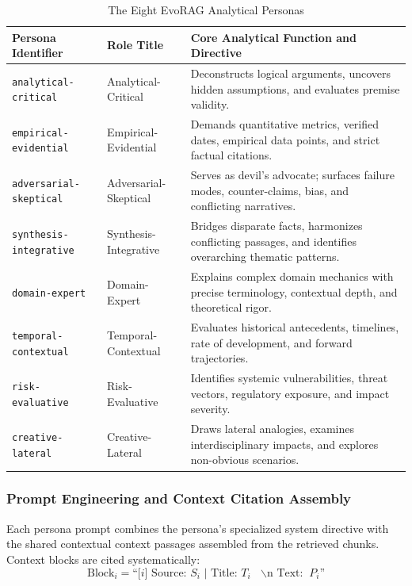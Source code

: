 \begin{table}[H]
\centering
\caption{The Eight EvoRAG Analytical Personas}
\label{tab:personas}
\small
\renewcommand{\arraystretch}{1.3}
\begin{tabularx}{\linewidth}{|l|p{3.8cm}|X|}
\hline
\textbf{Persona Identifier} & \textbf{Role Title} & \textbf{Core Analytical Function and Directive} \\
\hline
\texttt{analytical-critical} & Analytical-Critical & Deconstructs logical arguments, uncovers hidden assumptions, and evaluates premise validity. \\
\hline
\texttt{empirical-evidential} & Empirical-Evidential & Demands quantitative metrics, verified dates, empirical data points, and strict factual citations. \\
\hline
\texttt{adversarial-skeptical} & Adversarial-Skeptical & Serves as devil's advocate; surfaces failure modes, counter-claims, bias, and conflicting narratives. \\
\hline
\texttt{synthesis-integrative} & Synthesis-Integrative & Bridges disparate facts, harmonizes conflicting passages, and identifies overarching thematic patterns. \\
\hline
\texttt{domain-expert} & Domain-Expert & Explains complex domain mechanics with precise terminology, contextual depth, and theoretical rigor. \\
\hline
\texttt{temporal-contextual} & Temporal-Contextual & Evaluates historical antecedents, timelines, rate of development, and forward trajectories. \\
\hline
\texttt{risk-evaluative} & Risk-Evaluative & Identifies systemic vulnerabilities, threat vectors, regulatory exposure, and impact severity. \\
\hline
\texttt{creative-lateral} & Creative-Lateral & Draws lateral analogies, examines interdisciplinary impacts, and explores non-obvious scenarios. \\
\hline
\end{tabularx}
\end{table}

\subsubsection{Prompt Engineering and Context Citation Assembly}
Each persona prompt combines the persona's specialized system directive with the shared contextual context passages assembled from the retrieved chunks. Context blocks are cited systematically:
\begin{equation}
\label{eq:context_block}
\text{Block}_i = \text{``[}i\text{] Source: } S_i \text{ | Title: } T_i \text{ $\backslash$n Text: } P_i\text{''}
\end{equation}

